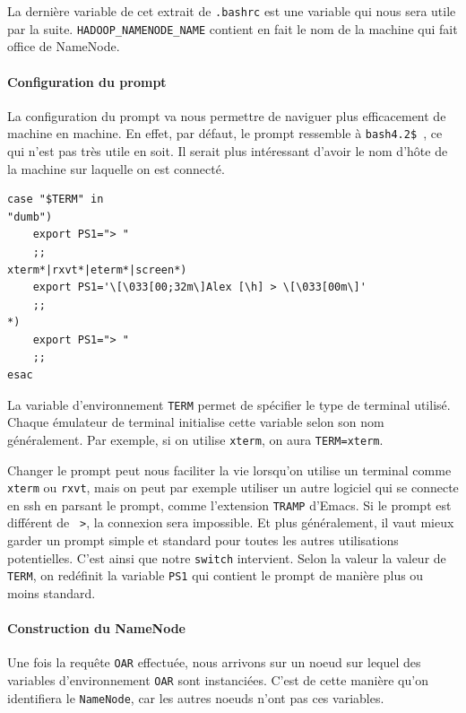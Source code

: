 \par La dernière variable de cet extrait de \texttt{.bashrc} est une variable qui nous sera utile par la suite. \texttt{HADOOP\_NAMENODE\_NAME} contient en fait le nom de la machine qui fait office de NameNode.

\paragraph{Configuration du prompt}
\label{sec:conf-du-prompt}

\par La configuration du prompt va nous permettre de naviguer plus efficacement de machine en machine. En effet, par défaut, le prompt ressemble à \texttt{bash4.2\$ }, ce qui n'est pas très utile en soit. Il serait plus intéressant d'avoir le nom d'hôte de la machine sur laquelle on est connecté.


\begin{verbatim}
case "$TERM" in
"dumb")
    export PS1="> "
    ;;
xterm*|rxvt*|eterm*|screen*)
    export PS1='\[\033[00;32m\]Alex [\h] > \[\033[00m\]'
    ;;
*)
    export PS1="> "
    ;;
esac
\end{verbatim}

\par La variable d'environnement \texttt{TERM} permet de spécifier le type de terminal utilisé. Chaque émulateur de terminal initialise cette variable selon son nom généralement. Par exemple, si on utilise \texttt{xterm}, on aura \texttt{TERM=xterm}. 
\par Changer le prompt peut nous faciliter la vie lorsqu'on utilise un terminal comme \texttt{xterm} ou \texttt{rxvt}, mais on peut par exemple utiliser un autre logiciel qui se connecte en ssh en parsant le prompt, comme l'extension \texttt{TRAMP} d'Emacs. Si le prompt est différent de \texttt{ >}, la connexion sera impossible. Et plus généralement, il vaut mieux garder un prompt simple et standard pour toutes les autres utilisations potentielles. C'est ainsi que notre \texttt{switch} intervient. Selon la valeur la valeur de \texttt{TERM}, on redéfinit la variable \texttt{PS1} qui contient le prompt de manière plus ou moins standard.

\paragraph{Construction du NameNode}
\label{sec:constr-du-namen}

\par Une fois la requête \texttt{OAR} effectuée, nous arrivons sur un noeud sur lequel des variables d'environnement \texttt{OAR} sont instanciées. C'est de cette manière qu'on identifiera le \texttt{NameNode}, car les autres noeuds n'ont pas ces variables.

